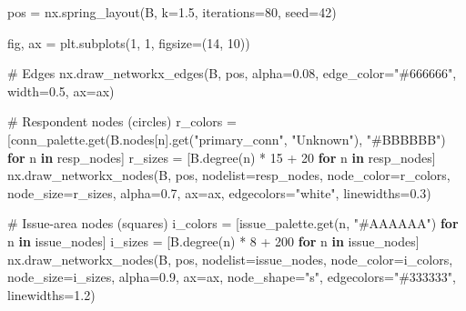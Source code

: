 \documentclass[
  letterpaper,
  DIV=11,
  numbers=noendperiod]{scrartcl}
\newenvironment{Shaded}{\begin{snugshade}}{\end{snugshade}}
\newcommand{\CommentTok}[1]{\textcolor[rgb]{0.37,0.37,0.37}{#1}}
\newcommand{\ControlFlowTok}[1]{\textcolor[rgb]{0.00,0.23,0.31}{\textbf{#1}}}
\newcommand{\DecValTok}[1]{\textcolor[rgb]{0.68,0.00,0.00}{#1}}
\newcommand{\FloatTok}[1]{\textcolor[rgb]{0.68,0.00,0.00}{#1}}
\newcommand{\KeywordTok}[1]{\textcolor[rgb]{0.00,0.23,0.31}{\textbf{#1}}}
\newcommand{\NormalTok}[1]{\textcolor[rgb]{0.00,0.23,0.31}{#1}}
\newcommand{\OperatorTok}[1]{\textcolor[rgb]{0.37,0.37,0.37}{#1}}
\newcommand{\StringTok}[1]{\textcolor[rgb]{0.13,0.47,0.30}{#1}}
\begin{document}
\begin{Shaded}
\begin{Highlighting}[]
\NormalTok{pos }\OperatorTok{=}\NormalTok{ nx.spring\_layout(B, k}\OperatorTok{=}\FloatTok{1.5}\NormalTok{, iterations}\OperatorTok{=}\DecValTok{80}\NormalTok{, seed}\OperatorTok{=}\DecValTok{42}\NormalTok{)}

\NormalTok{fig, ax }\OperatorTok{=}\NormalTok{ plt.subplots(}\DecValTok{1}\NormalTok{, }\DecValTok{1}\NormalTok{, figsize}\OperatorTok{=}\NormalTok{(}\DecValTok{14}\NormalTok{, }\DecValTok{10}\NormalTok{))}

\CommentTok{\# Edges}
\NormalTok{nx.draw\_networkx\_edges(B, pos, alpha}\OperatorTok{=}\FloatTok{0.08}\NormalTok{, edge\_color}\OperatorTok{=}\StringTok{"\#666666"}\NormalTok{,}
\NormalTok{                       width}\OperatorTok{=}\FloatTok{0.5}\NormalTok{, ax}\OperatorTok{=}\NormalTok{ax)}

\CommentTok{\# Respondent nodes (circles)}
\NormalTok{r\_colors }\OperatorTok{=}\NormalTok{ [conn\_palette.get(B.nodes[n].get(}\StringTok{"primary\_conn"}\NormalTok{, }\StringTok{"Unknown"}\NormalTok{),}
            \StringTok{"\#BBBBBB"}\NormalTok{) }\ControlFlowTok{for}\NormalTok{ n }\KeywordTok{in}\NormalTok{ resp\_nodes]}
\NormalTok{r\_sizes }\OperatorTok{=}\NormalTok{ [B.degree(n) }\OperatorTok{*} \DecValTok{15} \OperatorTok{+} \DecValTok{20} \ControlFlowTok{for}\NormalTok{ n }\KeywordTok{in}\NormalTok{ resp\_nodes]}
\NormalTok{nx.draw\_networkx\_nodes(B, pos, nodelist}\OperatorTok{=}\NormalTok{resp\_nodes, node\_color}\OperatorTok{=}\NormalTok{r\_colors,}
\NormalTok{                       node\_size}\OperatorTok{=}\NormalTok{r\_sizes, alpha}\OperatorTok{=}\FloatTok{0.7}\NormalTok{, ax}\OperatorTok{=}\NormalTok{ax,}
\NormalTok{                       edgecolors}\OperatorTok{=}\StringTok{"white"}\NormalTok{, linewidths}\OperatorTok{=}\FloatTok{0.3}\NormalTok{)}

\CommentTok{\# Issue{-}area nodes (squares)}
\NormalTok{i\_colors }\OperatorTok{=}\NormalTok{ [issue\_palette.get(n, }\StringTok{"\#AAAAAA"}\NormalTok{) }\ControlFlowTok{for}\NormalTok{ n }\KeywordTok{in}\NormalTok{ issue\_nodes]}
\NormalTok{i\_sizes }\OperatorTok{=}\NormalTok{ [B.degree(n) }\OperatorTok{*} \DecValTok{8} \OperatorTok{+} \DecValTok{200} \ControlFlowTok{for}\NormalTok{ n }\KeywordTok{in}\NormalTok{ issue\_nodes]}
\NormalTok{nx.draw\_networkx\_nodes(B, pos, nodelist}\OperatorTok{=}\NormalTok{issue\_nodes, node\_color}\OperatorTok{=}\NormalTok{i\_colors,}
\NormalTok{                       node\_size}\OperatorTok{=}\NormalTok{i\_sizes, alpha}\OperatorTok{=}\FloatTok{0.9}\NormalTok{, ax}\OperatorTok{=}\NormalTok{ax, node\_shape}\OperatorTok{=}\StringTok{"s"}\NormalTok{,}
\NormalTok{                       edgecolors}\OperatorTok{=}\StringTok{"\#333333"}\NormalTok{, linewidths}\OperatorTok{=}\FloatTok{1.2}\NormalTok{)}


\end{Highlighting}
\end{Shaded}
\end{document}
